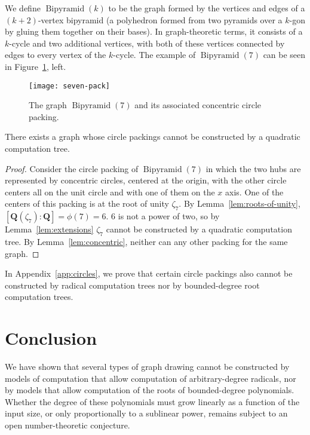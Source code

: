 \documentclass[oribibl,10pt]{llncs}
\newcommand{\rationals}{\mathbf{Q}}
\DeclareMathOperator{\Bipyr}{Bipyramid}
\begin{document}
We define $\Bipyr (k)$ to be the graph formed by the vertices and edges of a $(k+2)$-vertex bipyramid (a polyhedron formed from two pyramids over a $k$-gon by gluing them together on their bases). In graph-theoretic terms, it consists of a $k$-cycle and two additional vertices, with both of these vertices connected by edges to every vertex of the $k$-cycle.  The example of $\Bipyr  (7)$ can be seen in Figure~\ref{fig:seven-pack}, left.

\begin{figure}[t]
\centering
\vspace*{-2pt}
\texttt{[image: seven-pack]}
\vspace*{-4pt}
\caption{\label{fig:seven-pack} The graph $\Bipyr (7)$ and its associated concentric circle packing.}
\end{figure}

\begin{theorem}
\label{thm:no-quadratic}
There exists a graph whose circle packings cannot be constructed by a quadratic computation tree.
\end{theorem}

\begin{proof}
Consider the circle packing of $\Bipyr (7)$ in which the two hubs are represented by concentric circles,
centered at the origin, with the other circle centers all on the unit circle and with one of them on the $x$ axis. One of the centers of this packing is at the root of unity $\zeta_7$. By Lemma~\ref{lem:roots-of-unity},
$ [\rationals (\zeta_7) : \rationals] = \phi(7) = 6$.
$6$ is not a power of two, so by Lemma~\ref{lem:extensions} $\zeta_7$ cannot be constructed by a quadratic computation tree. By Lemma~\ref{lem:concentric}, neither can any other packing for the same graph.
\end{proof}

In Appendix~\ref{app:circles}, we prove that certain circle packings also cannot be constructed by radical computation trees
nor by
bounded-degree root computation trees.

\section{Conclusion}
We have shown that several types of graph drawing cannot be constructed by models of computation that allow computation of arbitrary-degree radicals, nor by models that allow computation of the roots of bounded-degree polynomials. Whether the degree of these polynomials must grow linearly as a function of the input size, or only proportionally to a sublinear power, remains subject to an open number-theoretic conjecture.
\end{document}
